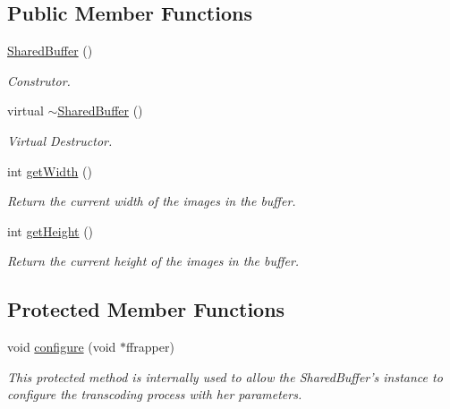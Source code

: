 \subsection*{Public Member Functions}
\begin{DoxyCompactItemize}
\item 
\hyperlink{classbr_1_1ufscar_1_1lince_1_1streaming_1_1SharedBuffer_af2437fb2e8b6838c91bf56a8f4b2fd8f}{SharedBuffer} ()
\begin{DoxyCompactList}\small\item\em Construtor. \item\end{DoxyCompactList}\item 
virtual \hyperlink{classbr_1_1ufscar_1_1lince_1_1streaming_1_1SharedBuffer_a9389b51eb706e3a9431645784415b684}{$\sim$SharedBuffer} ()
\begin{DoxyCompactList}\small\item\em Virtual Destructor. \item\end{DoxyCompactList}\item 
int \hyperlink{classbr_1_1ufscar_1_1lince_1_1streaming_1_1SharedBuffer_a80a2f60b900c8e7a440b1ad12a03e5d2}{getWidth} ()
\begin{DoxyCompactList}\small\item\em Return the current width of the images in the buffer. \item\end{DoxyCompactList}\item 
int \hyperlink{classbr_1_1ufscar_1_1lince_1_1streaming_1_1SharedBuffer_aee8fc805662cb56cb5842f6ed090b138}{getHeight} ()
\begin{DoxyCompactList}\small\item\em Return the current height of the images in the buffer. \item\end{DoxyCompactList}\end{DoxyCompactItemize}
\subsection*{Protected Member Functions}
\begin{DoxyCompactItemize}
\item 
void \hyperlink{classbr_1_1ufscar_1_1lince_1_1streaming_1_1SharedBuffer_a7479737f634864d9d5756eb41c68cec3}{configure} (void $\ast$ffrapper)
\begin{DoxyCompactList}\small\item\em This protected method is internally used to allow the SharedBuffer's instance to configure the transcoding process with her parameters. \item\end{DoxyCompactList}\end{DoxyCompactItemize}



